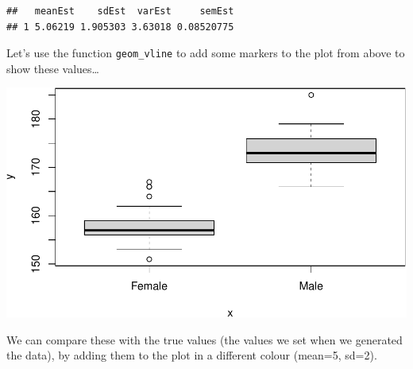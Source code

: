 \documentclass[
  a4paperpaper,
]{book}
\newenvironment{Shaded}{\begin{snugshade}}{\end{snugshade}}
\newcommand{\CommentTok}[1]{\textcolor[rgb]{0.56,0.35,0.01}{\textit{#1}}}
\newcommand{\DataTypeTok}[1]{\textcolor[rgb]{0.13,0.29,0.53}{#1}}
\newcommand{\DecValTok}[1]{\textcolor[rgb]{0.00,0.00,0.81}{#1}}
\newcommand{\KeywordTok}[1]{\textcolor[rgb]{0.13,0.29,0.53}{\textbf{#1}}}
\newcommand{\NormalTok}[1]{#1}
\newcommand{\OperatorTok}[1]{\textcolor[rgb]{0.81,0.36,0.00}{\textbf{#1}}}
\newcommand{\StringTok}[1]{\textcolor[rgb]{0.31,0.60,0.02}{#1}}
\begin{document}
\begin{verbatim}
##   meanEst    sdEst  varEst     semEst
## 1 5.06219 1.905303 3.63018 0.08520775
\end{verbatim}

Let's use the function \texttt{geom\_vline} to add some markers to the plot from above to show these values\ldots{}

\begin{Shaded}
\end{Shaded}

\begin{center}\includegraphics{BB852_files/figure-latex/unnamed-chunk-96-1} \end{center}

We can compare these with the true values (the values we set when we generated the data), by adding them to the plot in a different colour (mean=5, sd=2).
\end{document}
